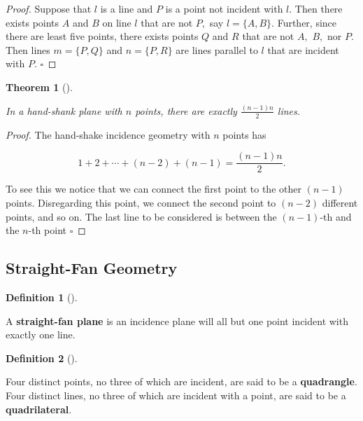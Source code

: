 \documentclass[
  twoside,
  12pt,
  letterpaper,
  fleqn]{article}
\theoremstyle{definition}
\newtheorem{definition}{Definition}[section]
\theoremstyle{definition}
\theoremstyle{plain}
\theoremstyle{plain}
\newtheorem{theorem}{Theorem}[section]
\theoremstyle{remark}
\begin{document}
\begin{proof}

Suppose that \(l\) is a line and \(P\) is a point not incident with
\(l.\) Then there exists points \(A\) and \(B\) on line \(l\) that are
not \(P,\) say \(l=\{A,B\}.\) Further, since there are least five
points, there exists points \(Q\) and \(R\) that are not \(A,\) \(B,\)
nor \(P.\) Then lines \(m=\{P,Q\}\) and \(n=\{P,R\}\) are lines parallel
to \(l\) that are incident with \(P.\) \(\square\)

\end{proof}

\begin{theorem}[]\protect\hypertarget{thm-hand-shank-plane}{}\label{thm-hand-shank-plane}

In a hand-shank plane with \(n\) points, there are exactly
\(\frac{(n-1)n}{2}\) lines.

\end{theorem}

\begin{proof}

The hand-shake incidence geometry with \(n\) points has

\[1+2+\cdots + (n-2)+(n-1)= \frac{(n-1)n}{2}.\]

To see this we notice that we can connect the first point to the other
\((n-1)\) points. Disregarding this point, we connect the second point
to \((n-2)\) different points, and so on. The last line to be considered
is between the \((n-1)\)-th and the \(n\)-th point \(\square\)

\end{proof}

\hypertarget{straight-fan-geometry}{%
\subsection{Straight-Fan Geometry}\label{straight-fan-geometry}}

\begin{definition}[]\protect\hypertarget{def-straight-fan}{}\label{def-straight-fan}

A \textbf{straight-fan plane} is an incidence plane will all but one
point incident with exactly one line.

\end{definition}

\begin{definition}[]\protect\hypertarget{def-quadrilateral}{}\label{def-quadrilateral}

Four distinct points, no three of which are incident, are said to be a
\textbf{quadrangle}. Four distinct lines, no three of which are incident
with a point, are said to be a \textbf{quadrilateral}.

\end{definition}
\end{document}
